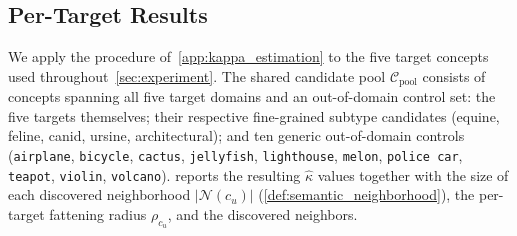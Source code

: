 
\subsection{Per-Target Results}
\label{app:kappa_per_target}
We apply the procedure of~\cref{app:kappa_estimation} to the five target concepts used throughout~\cref{sec:experiment}. The shared candidate pool $\mathcal{C}_{\mathrm{pool}}$ consists of concepts spanning all five target domains and an out-of-domain control set: the five targets themselves; their respective fine-grained subtype candidates (equine, feline, canid, ursine, architectural); and ten generic out-of-domain controls (\texttt{airplane}, \texttt{bicycle}, \texttt{cactus}, \texttt{jellyfish}, \texttt{lighthouse}, \texttt{melon}, \texttt{police car}, \texttt{teapot}, \texttt{violin}, \texttt{volcano}). 
 reports the resulting $\hat\kappa$ values together with the size of each discovered neighborhood $|\mathcal{N}(c_u)|$ (\cref{def:semantic_neighborhood}), the per-target fattening radius $\rho_{c_u}$, and the discovered neighbors.

